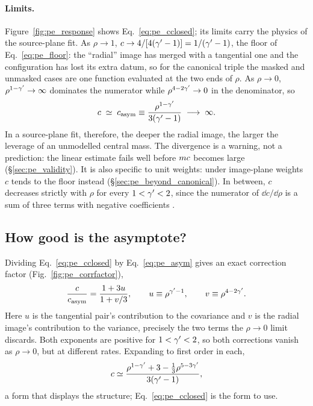 \paragraph{Limits.} Figure~\ref{fig:pe_response} shows
Eq.~\eqref{eq:pe_cclosed}; its limits carry the physics of the
source-plane fit. As $\rho\to1$, $c\to4/[4(\gamma'-1)]=1/(\gamma'-1)$, the
floor of Eq.~\eqref{eq:pe_floor}: the ``radial'' image has merged with
a tangential one and the configuration has lost its extra datum, so for
the canonical triple the masked and unmasked cases are one function
evaluated at the two ends of $\rho$. As $\rho\to0$, $\rho^{1-\gamma'}\to\infty$
dominates the numerator while $\rho^{4-2\gamma'}\to0$ in the denominator, so
\begin{equation}
    c\;\simeq\;c_{\rm asym}\equiv\frac{\rho^{1-\gamma'}}{3(\gamma'-1)}
    \;\longrightarrow\;\infty .
    \label{eq:pe_asym}
\end{equation}
In a source-plane fit, therefore, the deeper the radial image, the
larger the leverage of an unmodelled central mass. The divergence is a
warning, not a prediction: the linear estimate fails well before
$m c$ becomes large (\S\ref{sec:pe_validity}). It is also specific to
unit weights: under image-plane weights $c$ tends to the floor instead
(\S\ref{sec:pe_beyond_canonical}). In between, $c$ decreases strictly
with $\rho$ for every $1<\gamma'<2$, since the numerator of $\dd c/\dd\rho$
is a sum of three terms with negative coefficients
.

\subsection{How good is the asymptote?}

Dividing Eq.~\eqref{eq:pe_cclosed} by Eq.~\eqref{eq:pe_asym} gives an
exact correction factor (Fig.~\ref{fig:pe_corrfactor}),
\begin{equation}
    \frac{c}{c_{\rm asym}}=\frac{1+3u}{1+v/3},
    \qquad u\equiv\rho^{\gamma'-1},\qquad v\equiv\rho^{4-2\gamma'}.
    \label{eq:pe_corrfactor}
\end{equation}
Here $u$ is the tangential pair's contribution to the covariance and $v$
is the radial image's contribution to the variance, precisely the
two terms the $\rho\to0$ limit discards. Both exponents are positive for
$1<\gamma'<2$, so both corrections vanish as $\rho\to0$, but at different
rates. Expanding to first order in each,
\begin{equation}
    c\simeq\frac{\rho^{1-\gamma'}+3-\tfrac13\rho^{5-3\gamma'}}{3(\gamma'-1)} ,
    \label{eq:pe_next_order}
\end{equation}
a form that displays the structure; Eq.~\eqref{eq:pe_cclosed} is the
form to use.

